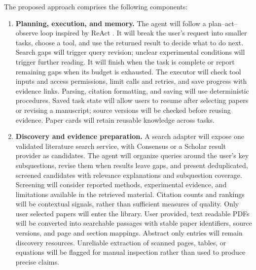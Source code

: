 \documentclass{article}
\begin{document}
The proposed approach comprises the following components:
\begin{enumerate}
\item \textbf{Planning, execution, and memory.} The agent will follow a plan--act--observe loop inspired by ReAct \cite{react}. It will break the user's request into smaller tasks, choose a tool, and use the returned result to decide what to do next. Search gaps will trigger query revision; unclear experimental conditions will trigger further reading. It will finish when the task is complete or report remaining gaps when its budget is exhausted. The executor will check tool inputs and access permissions, limit calls and retries, and save progress with evidence links. Parsing, citation formatting, and saving will use deterministic procedures. Saved task state will allow users to resume after selecting papers or revising a manuscript; source versions will be checked before reusing evidence. Paper cards will retain reusable knowledge across tasks.

\item \textbf{Discovery and evidence preparation.} A search adapter will expose one validated literature search service, with Consensus or a Scholar result provider as candidates. The agent will organize queries around the user's key subquestions, revise them when results leave gaps, and present deduplicated, screened candidates with relevance explanations and subquestion coverage. Screening will consider reported methods, experimental evidence, and limitations available in the retrieved material. Citation counts and rankings will be contextual signals, rather than sufficient measures of quality. Only user selected papers will enter the library. User provided, text readable PDFs will be converted into searchable passages with stable paper identifiers, source versions, and page and section mappings. Abstract only entries will remain discovery resources. Unreliable extraction of scanned pages, tables, or equations will be flagged for manual inspection rather than used to produce precise claims.


\end{enumerate}
\end{document}
